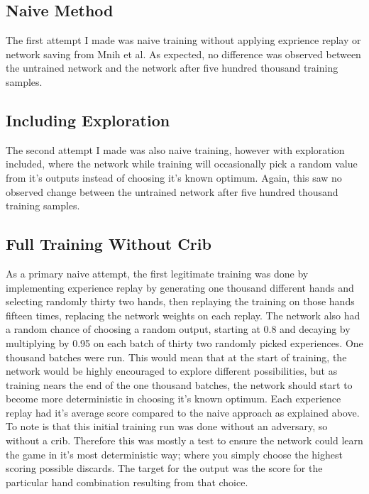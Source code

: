 \documentclass[]{article}
\begin{document}
\subsection{Naive Method}

The first attempt I made was naive training without applying exprience replay or network saving from Mnih et al\cite{deepmind_2015}. As expected, no difference was observed between the untrained network and the network after five hundred thousand training samples. 

\subsection{Including Exploration}

The second attempt I made was also naive training, however with exploration included, where the network while training will occasionally pick a random value from it's outputs instead of choosing it's known optimum\cite{drl_survey}. Again, this saw no observed change between the untrained network after five hundred thousand training samples. 

\subsection{Full Training Without Crib}

As a primary naive attempt, the first legitimate training was done by implementing experience replay by generating one thousand different hands and selecting randomly thirty two hands, then replaying the training on those hands fifteen times, replacing the network weights on each replay. The network also had a random chance of choosing a random output, starting at 0.8 and decaying by multiplying by 0.95 on each batch of thirty two randomly picked experiences. One thousand batches were run. This would mean that at the start of training, the network would be highly encouraged to explore different possibilities, but as training nears the end of the one thousand batches, the network should start to become more deterministic in choosing it's known optimum. Each experience replay had it's average score compared to the naive approach as explained above. To note is that this initial training run was done without an adversary, so without a crib. Therefore this was mostly a test to ensure the network could learn the game in it's most deterministic way; where you simply choose the highest scoring possible discards. The target for the output was the score for the particular hand combination resulting from that choice.
\end{document}

